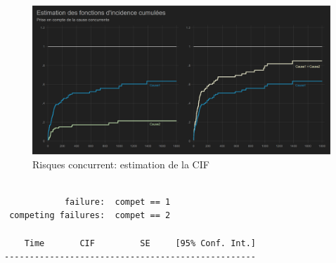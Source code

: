\documentclass[
  12pt,
  letterpaper,
  DIV=11,
  numbers=noendperiod,
  onepage,
  openany]{scrreprt}
\begin{document}
\begin{figure}

\caption{Risques concurrent: estimation de la CIF}

{\centering \includegraphics{images/Image17.png}

}

\end{figure}

\begin{verbatim}

            failure:  compet == 1
 competing failures:  compet == 2

    Time       CIF         SE     [95% Conf. Int.]
--------------------------------------------------
\end{verbatim}
\end{document}
